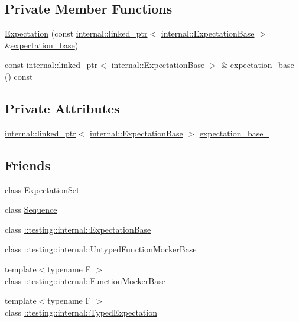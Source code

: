 \subsection*{Private Member Functions}
\begin{DoxyCompactItemize}
\item 
\hyperlink{classtesting_1_1Expectation_a26385861205f24dc78b66d9ba59663b0}{Expectation} (const \hyperlink{classtesting_1_1internal_1_1linked__ptr}{internal\+::linked\+\_\+ptr}$<$ \hyperlink{classtesting_1_1internal_1_1ExpectationBase}{internal\+::\+Expectation\+Base} $>$ \&\hyperlink{classtesting_1_1Expectation_abd4dcb022d192d92b529d1ddefbfd8a9}{expectation\+\_\+base})
\item 
const \hyperlink{classtesting_1_1internal_1_1linked__ptr}{internal\+::linked\+\_\+ptr}$<$ \hyperlink{classtesting_1_1internal_1_1ExpectationBase}{internal\+::\+Expectation\+Base} $>$ \& \hyperlink{classtesting_1_1Expectation_abd4dcb022d192d92b529d1ddefbfd8a9}{expectation\+\_\+base} () const
\end{DoxyCompactItemize}
\subsection*{Private Attributes}
\begin{DoxyCompactItemize}
\item 
\hyperlink{classtesting_1_1internal_1_1linked__ptr}{internal\+::linked\+\_\+ptr}$<$ \hyperlink{classtesting_1_1internal_1_1ExpectationBase}{internal\+::\+Expectation\+Base} $>$ \hyperlink{classtesting_1_1Expectation_a96caf8f40e769b68ea010c098f7190fa}{expectation\+\_\+base\+\_\+}
\end{DoxyCompactItemize}
\subsection*{Friends}
\begin{DoxyCompactItemize}
\item 
class \hyperlink{classtesting_1_1Expectation_acf5c2877a449d4ad1889ee5833ebb193}{Expectation\+Set}
\item 
class \hyperlink{classtesting_1_1Expectation_a26271d5afaff6e6d3f00c055c63d0b24}{Sequence}
\item 
class \hyperlink{classtesting_1_1Expectation_a9a45d4d807ed262ab76ab842b8d33761}{\+::testing\+::internal\+::\+Expectation\+Base}
\item 
class \hyperlink{classtesting_1_1Expectation_a709c2d6bee1223cfbcadc58e884cdb4b}{\+::testing\+::internal\+::\+Untyped\+Function\+Mocker\+Base}
\item 
{\footnotesize template$<$typename F $>$ }\\class \hyperlink{classtesting_1_1Expectation_a92066c162835b0d3d2317c9643a87e7e}{\+::testing\+::internal\+::\+Function\+Mocker\+Base}
\item 
{\footnotesize template$<$typename F $>$ }\\class \hyperlink{classtesting_1_1Expectation_a86c4872d3edbede5e8ac148525bc8893}{\+::testing\+::internal\+::\+Typed\+Expectation}
\end{DoxyCompactItemize}


